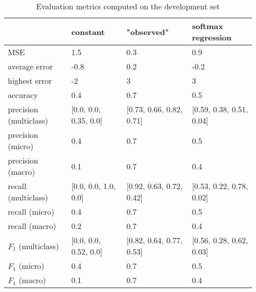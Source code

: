 \begin{table}[H]
\caption{Evaluation metrics computed on the development set}
\label{tbl:sais_eval_development}
\begin{tabular}{llll}
\toprule
 & constant & "observed" & softmax regression \\
\midrule
MSE & 1.5 & 0.3 & 0.9 \\
average error & -0.8 & 0.2 & -0.2 \\
highest error & -2 & 3 & 3 \\
accuracy & 0.4 & 0.7 & 0.5 \\
precision (multiclass) & [0.0, 0.0, 0.35, 0.0] & [0.73, 0.66, 0.82, 0.71] & [0.59, 0.38, 0.51, 0.04] \\
precision (micro) & 0.4 & 0.7 & 0.5 \\
precision (macro) & 0.1 & 0.7 & 0.4 \\
recall (multiclass) & [0.0, 0.0, 1.0, 0.0] & [0.92, 0.63, 0.72, 0.42] & [0.53, 0.22, 0.78, 0.02] \\
recall (micro) & 0.4 & 0.7 & 0.5 \\
recall (macro) & 0.2 & 0.7 & 0.4 \\
$F_1$ (multiclass) & [0.0, 0.0, 0.52, 0.0] & [0.82, 0.64, 0.77, 0.53] & [0.56, 0.28, 0.62, 0.03] \\
$F_1$ (micro) & 0.4 & 0.7 & 0.5 \\
$F_1$ (macro) & 0.1 & 0.7 & 0.4 \\
\bottomrule
\end{tabular}
\end{table}
